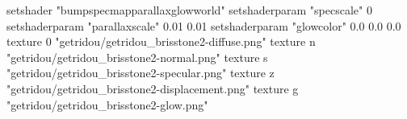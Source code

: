 setshader "bumpspecmapparallaxglowworld"
setshaderparam "specscale" 0
setshaderparam "parallaxscale" 0.01 0.01
setshaderparam "glowcolor" 0.0 0.0 0.0
texture 0 "getridou/getridou_brisstone2-diffuse.png"
texture n "getridou/getridou_brisstone2-normal.png"
texture s "getridou/getridou_brisstone2-specular.png"
texture z "getridou/getridou_brisstone2-displacement.png"
texture g "getridou/getridou_brisstone2-glow.png"
